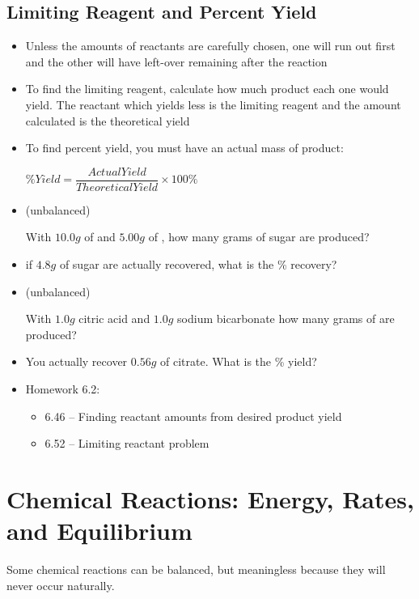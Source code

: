 \documentclass[12pt, openany, letterpaper]{memoir}
\begin{document}
\section{Limiting Reagent and Percent Yield}
\begin{itemize}
	\item Unless the amounts of reactants are carefully chosen, one will run out first and the other will have left-over remaining after the reaction
	\item To find the limiting reagent, calculate how much product each one would yield. The reactant which yields less is the limiting reagent and the amount calculated is the theoretical yield
	\item To find percent yield, you must have an actual mass of product:

	      $\% Yield = \dfrac{Actual Yield}{Theoretical Yield}\times 100\%$
	\item {} (unbalanced)

	      With $10.0g$ of  and $5.00g$ of , how many grams of sugar are produced?
	\item if $4.8g$ of sugar are actually recovered, what is the \% recovery?

	\item {} (unbalanced)

	      With $1.0g$ citric acid and $1.0g$ sodium bicarbonate how many grams of  are produced?

	\item You actually recover $0.56g$ of citrate. What is the \% yield?
	\item Homework 6.2:
	      \begin{itemize}
		      \item 6.46 -- Finding reactant amounts from desired product yield
		      \item 6.52 -- Limiting reactant problem
	      \end{itemize}
\end{itemize}

\chapter{Chemical Reactions: Energy, Rates, and Equilibrium}
Some chemical reactions can be balanced, but meaningless because they will never occur naturally.

\end{document}
